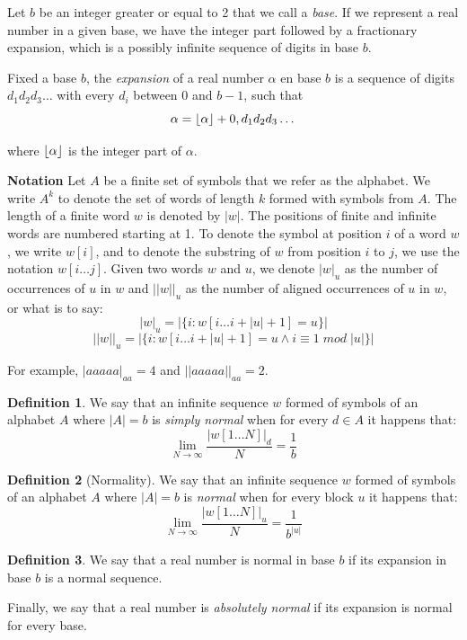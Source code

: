 \documentclass[11pt,a4paper]{tesis}
\theoremstyle{definition}
\newtheorem{definition}{Definition}[section]
\DeclarePairedDelimiter{\floor}{\lfloor}{\rfloor}
\begin{document}
Let $b$ be an integer greater or equal to 2 that we call a \textit{base}. If we represent a real number in a given base, we have the integer part followed by a fractionary expansion, which is a possibly infinite sequence of digits in base $b$.

Fixed a base $b$, the \textit{expansion} of a real number $\alpha$ en base $b$ is a sequence of digits $d_1d_2d_3\dots$ with every $d_i$ between 0 and $b-1$, such that
$$\alpha = \floor{\alpha} + 0,d_1d_2d_3\dots$$

where $\floor{\alpha}$ is the integer part of $\alpha$.

\textbf{Notation}
Let $A$ be a finite set of symbols that we refer as the alphabet. We write $A^k$ to denote the set of words of length $k$ formed with symbols from $A$. The length of a finite word $w$ is denoted by $|w|$.
The positions of finite and infinite words are numbered starting at 1. To denote the symbol at position $i$ of a word $w$, we write $w[i]$, and to denote the substring of $w$ from position $i$ to $j$, we use the notation $w[i \dots j]$.  
Given two words $w$ and $u$, we denote $|w|_u$ as the number of occurrences of $u$ in $w$ and $||w||_u$ as the number of aligned occurrences of $u$ in $w$, or what is to say:
    $$|w|_u = |\{i: w[i \dots i + |u| + 1] = u\}|$$
    $$||w||_u = |\{i: w[i \dots i + |u| + 1] = u \wedge i \equiv 1 \; mod \; |u| \}|$$

For example, $|aaaaa|_{aa} = 4$ and $||aaaaa||_{aa} = 2$.
\\

\begin{definition}
    We say that an infinite sequence $w$ formed of symbols of an alphabet $A$ where $|A| = b$ is \textit{simply normal} when for every $d \in A$ it happens that:
    $$\lim_{N\to\infty} \frac{|w[1 \dots N]|_d}{N} = \frac{1}{b}$$
\end{definition}

\begin{definition}[Normality]
    We say that an infinite sequence $w$ formed of symbols of an alphabet $A$ where $|A| = b$ is \textit{normal} when for every block $u$ it happens that:
    $$\lim_{N\to\infty} \frac{|w[1 \dots N]|_u}{N} = \frac{1}{b^{|u|}}$$
\end{definition}

\begin{definition}
    We say that a real number is normal in base $b$ if its expansion in base $b$ is a normal sequence. 
    
    Finally, we say that a real number is \textit{absolutely normal} if its expansion is normal for every base.
\end{definition}
\end{document}
